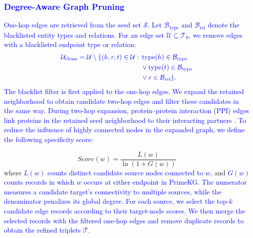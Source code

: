 \documentclass[lettersize,journal]{IEEEtran}
\begin{document}
\subsubsection{\textcolor{blue}{Degree-Aware Graph Pruning}}

    \textcolor{blue}{One-hop edges are retrieved from the seed set $\mathcal{S}$. Let $\mathcal{B}_{\mathrm{type}}$ and $\mathcal{B}_{\mathrm{rel}}$ denote the blacklisted entity types and relations. For an edge set $\mathcal{U}\subseteq\mathcal{T}_0$, we remove edges with a blacklisted endpoint type or relation:}
    \begin{equation}
        {\color{blue}
        \begin{aligned}
        \mathcal{U}_{\mathrm{clean}}=\mathcal{U}\setminus\{(h,r,t)\in\mathcal{U}:\;&
        \operatorname{type}(h)\in\mathcal{B}_{\mathrm{type}}\\
        &\lor\operatorname{type}(t)\in\mathcal{B}_{\mathrm{type}}\\
        &\lor r\in\mathcal{B}_{\mathrm{rel}}\}.
        \end{aligned}
        }
        \label{eq:blacklist_filter}
    \end{equation}
    \textcolor{blue}{The blacklist filter is first applied to the one-hop edges. We expand the retained neighborhood to obtain candidate two-hop edges and filter these candidates in the same way. During two-hop expansion, protein--protein interaction (PPI) edges link proteins in the retained seed neighborhood to their interacting partners} \cite{barabasi2011network,cheng2019network}. \textcolor{blue}{To reduce the influence of highly connected nodes in the expanded graph, we define the following specificity score:}

    \begin{equation}
        Score(w) = \frac{L(w)}{\ln(1 + G(w))}
        \label{eq:spec-score}
    \end{equation}
    where \textcolor{blue}{$L(w)$ counts distinct candidate source nodes connected to $w$}, and \textcolor{blue}{$G(w)$ counts records in which $w$ occurs at either endpoint in PrimeKG}. \textcolor{blue}{The numerator measures a candidate target's connectivity to multiple sources, while the denominator penalizes its global degree. For each source, we select the top-$k$ candidate edge records according to their target-node scores. We then merge the selected records with the filtered one-hop edges and remove duplicate records to obtain the refined triplets $\mathcal{T}$.}
\end{document}
